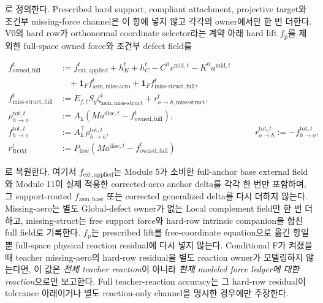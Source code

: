 \documentclass[11pt,a4paper]{article}
\begin{document}
로 정의한다. Prescribed hard support, compliant attachment, projective target와
조건부 missing-force channel은 이 항에 넣지 않고 각각의 owner에서만 한 번 더한다.
V0의 hard row가 orthonormal coordinate selector라는 계약 아래 hard lift
\(f_{\mathrm p}\)를 제외한 full-space owned force와 조건부 defect field를

\begin{equation}
\begin{aligned}
  f_{\mathrm{owned,full}}^t
  &:={}f_{\mathrm{ext,applied}}^t+h_K^t+h_C^t
  -C^0v^{\mathrm{mid},t}-K^0u^{\mathrm{mid},t}\\
  &\quad+\mathbf1_F f_{\mathrm{asm,miss\mbox{-}aero}}^t
  +\mathbf1_F f_{\mathrm{miss\mbox{-}struct,full}}^t,\\
  f_{\mathrm{miss\mbox{-}struct,full}}^t
  &:={}E_{f,t}S_y\zeta_{\mathrm{asm,miss\mbox{-}struct}}^t
  +r_{o\rightarrow h,\mathrm{miss\mbox{-}struct}}^t,\\
  \rho_{h\rightarrow o}^{\mathrm{tot},t}
  &:={}A_{\mathrm h}(Ma^{\mathrm{disc},t}-f_{\mathrm{owned,full}}^t),\\
  f_{h\rightarrow o}^{\mathrm{tot},t}
  &:={}A_{\mathrm h}^\top\rho_{h\rightarrow o}^{\mathrm{tot},t},
  &\qquad
  r_{o\rightarrow h}^{\mathrm{tot},t}:=-f_{h\rightarrow o}^{\mathrm{tot},t},\\
  r_{\mathrm{ROM}}^t
  &:={}P_{\mathrm{free}}(Ma^{\mathrm{disc},t}-f_{\mathrm{owned,full}}^t)
\end{aligned}
  \label{eq:hard-total-reaction-residual}
\end{equation}

로 복원한다. 여기서 \(f_{\mathrm{ext,applied}}\)는 Module 5가 소비한 full-anchor base
external field와 Module 11이 실제 적용한 corrected-aero anchor delta를 각각 한 번만 포함하며,
그 support-routed \(f_{\mathrm{asm,base}}\) 또는 corrected generalized delta를 다시 더하지 않는다.
Missing-aero는 별도 Global-defect owner가 없는 Local complement field만 한 번 더하고,
missing-struct는 free support force와 hard-row intrinsic companion을 합친 full field로 기록한다.
\(f_{\mathrm p}\)는 prescribed lift를 free-coordinate equation으로 옮긴 항일 뿐
full-space physical reaction residual에 다시 넣지 않는다.
Conditional F가 켜졌을 때 teacher missing-aero의 hard-row residual을 별도 reaction owner가
모델링하지 않는다면, 이 값은 \emph{전체 teacher reaction}이 아니라
\emph{현재 modeled force ledger에 대한 reaction}으로만 보고한다.
Full teacher-reaction accuracy는 그 hard-row residual이 tolerance 아래이거나
별도 reaction-only channel을 명시한 경우에만 주장한다.
\end{document}
